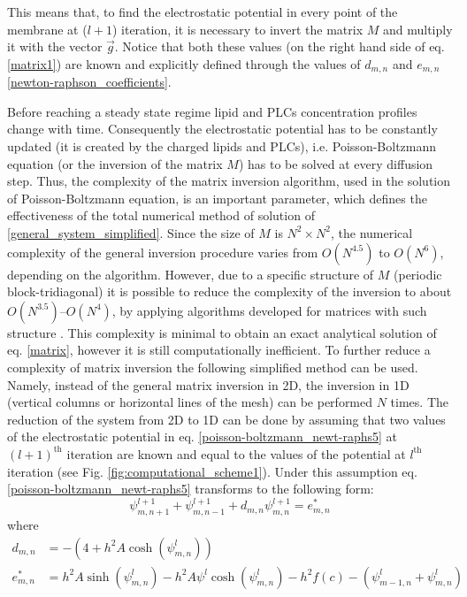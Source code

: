 This means that, to find the electrostatic potential in every point of the membrane at ($l+1$) iteration, it is necessary to invert the matrix $M$ and multiply it with the vector $\vec{g}$. Notice that both these values (on the right hand side of eq. \eqref{matrix1}) are known and explicitly defined through the values of $d_{m,n}$ and $e_{m,n}$ \eqref{newton-raphson_coefficients}.

Before reaching a steady state regime lipid and PLCs concentration profiles change with time. Consequently the electrostatic potential has to be constantly updated (it is created by the charged lipids and PLCs), i.e. Poisson-Boltzmann equation (or the inversion of the matrix $M$) has to be solved at every diffusion step. Thus, the complexity of the matrix inversion algorithm, used in the solution of Poisson-Boltzmann equation, is an important parameter, which defines the effectiveness of the total numerical method of solution of \eqref{general_system_simplified}. Since the size of $M$ is $N^2\times N^2$, the numerical complexity of the general inversion procedure varies from $O(N^{4.5})$ to $O(N^6)$, depending on the algorithm. However, due to a specific structure of $M$ (periodic block-tridiagonal) it is possible to reduce the complexity of the inversion to about $O(N^{3.5})$--$O(N^4)$, by applying algorithms developed for matrices with such structure \cite{Napolitano1985,Bieniasz2001}. This complexity is minimal to obtain an exact analytical solution of eq. \eqref{matrix}, however it is still computationally inefficient. To further reduce a complexity of matrix inversion the following simplified method can be used. Namely, instead of the general matrix inversion in 2D, the inversion in 1D (vertical columns or horizontal lines of the mesh) can be performed $N$ times. The reduction of the system from 2D to 1D can be done by assuming that two values of the electrostatic potential in eq. \eqref{poisson-boltzmann_newt-raphs5} at $(l+1)^{\text{th}}$ iteration are known and equal to the values of the potential at $l^{\text{th}}$ iteration (see Fig. \ref{fig:computational_scheme1}). Under this assumption eq. \eqref{poisson-boltzmann_newt-raphs5} transforms to the following form:
\begin{equation}
  \label{poisson-boltzmann_newt-raphs6}\psi^{l+1}_{m,n+1}+\psi^{l+1}_{m,n-1}+d_{m,n}\psi^{l+1}_{m,n} = e^*_{m,n} 
\end{equation}
where 
\begin{align}
\label{newton-raphson_coefficients1}
 d_{m,n} &= -(4+h^2A\cosh(\psi^l_{m,n})) \nonumber \\
 e^*_{m,n} &= h^2A\sinh(\psi^l_{m,n}) - h^2A\psi^l\cosh(\psi^l_{m,n}) - h^2f(c) - (\psi^{l}_{m-1,n} + \psi^{l}_{m,n})
\end{align}

